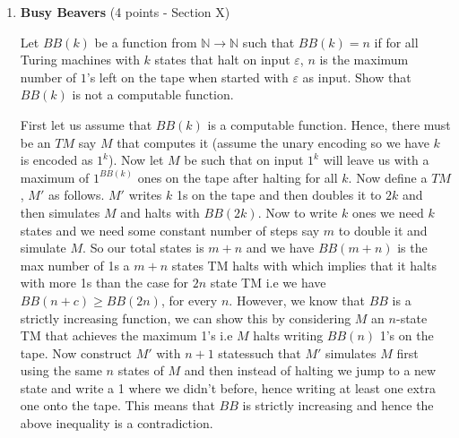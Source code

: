 \documentclass[11pt]{article}
\begin{document}
\begin{enumerate}
 \item \textbf{Busy Beavers} (4 points - Section X)
 
 Let $BB(k)$ be a function from $\mathbb{N} \rightarrow \mathbb{N}$ such that $BB(k) = n$ if for all Turing machines with $k$ states that halt on input $\varepsilon$, $n$ is the maximum number of $1$'s left on the tape when started with $\varepsilon$ as input. Show that $BB(k)$ is not a computable function.

 \begin{answer}
     First let us assume that $BB(k)$ is a computable function. Hence, there must be an $TM$ say $M$ that computes it (assume the unary encoding so we have $k$ is encoded as $1^{k}$). Now let $M$ be such that on input $1^{k}$ will leave us with a maximum of $1^{BB(k)}$ ones on the tape after halting for all $k$. Now define a $TM$, $M'$ as follows. $M'$ writes $k$ 1s on the tape and then doubles it to $2k$ and then simulates $M$ and halts with $BB(2k)$. Now to write $k$ ones we need $k$ states and we need some constant number of steps say $m$ to double it and simulate $M$. So our total states is $m + n$ and we have $BB(m + n)$ is the max number of 1s a $m + n$ states TM halts with which implies that it halts with more 1s than the case for $2n$ state TM i.e we have $BB(n + c) \ge BB(2n)$, for every $n$. However, we know that $BB$ is a strictly increasing function, we can show this by considering $M$ an $n$-state TM that achieves the maximum 1's i.e $M$ halts writing $BB(n)$ 1's on the tape. Now construct $M'$ with $n + 1$ statessuch that $M'$ simulates $M$ first using the same $n$ states of $M$ and then instead of halting we jump to a new state and write a 1 where we didn't before, hence writing at least one extra one onto the tape. This means that $BB$ is strictly increasing and hence the above inequality is a contradiction.
\end{answer}

\end{enumerate}
\end{document}
